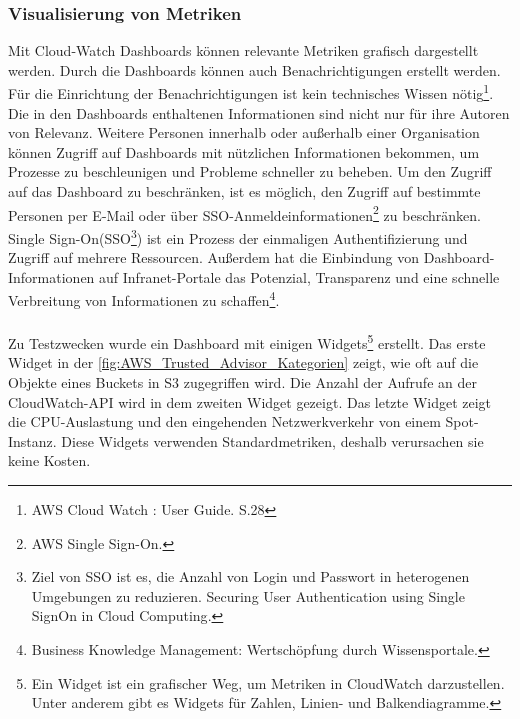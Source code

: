 \subsubsection*{Visualisierung von Metriken}
Mit Cloud-Watch Dashboards können relevante Metriken grafisch dargestellt werden. %
Durch die Dashboards können auch Benachrichtigungen erstellt werden. Für die Einrichtung der Benachrichtigungen ist kein technisches Wissen nötig\footnote{AWS Cloud Watch : User Guide. S.28\cite{AMZ14}}.
Die in den Dashboards enthaltenen Informationen sind nicht nur für ihre Autoren von Relevanz. Weitere Personen innerhalb oder außerhalb einer Organisation können Zugriff auf Dashboards mit nützlichen Informationen bekommen, um Prozesse zu beschleunigen und Probleme schneller zu beheben. Um den Zugriff auf das Dashboard zu beschränken, ist es möglich, den Zugriff auf bestimmte Personen per E-Mail oder über SSO-Anmeldeinformationen\footnote{ AWS Single Sign-On.\cite{AMZ33}} zu beschränken. Single Sign-On(SSO\footnote{Ziel von SSO ist es, die Anzahl von Login und Passwort in heterogenen Umgebungen zu reduzieren. Securing User Authentication using Single SignOn in Cloud Computing\cite{SSO}.}) ist ein Prozess der einmaligen Authentifizierung und Zugriff auf mehrere Ressourcen. Außerdem hat die Einbindung von Dashboard-Informationen auf Infranet-Portale das Potenzial, Transparenz und eine schnelle Verbreitung von Informationen zu schaffen\footnote{Business Knowledge Management: Wertschöpfung durch Wissensportale\cite{BKM}.}. 
\\\\
Zu Testzwecken wurde ein Dashboard mit einigen Widgets\footnote{Ein Widget ist ein grafischer Weg, um Metriken in CloudWatch darzustellen. Unter anderem gibt es Widgets für Zahlen, Linien- und Balkendiagramme.} erstellt. Das erste Widget in der \autoref{fig:AWS_Trusted_Advisor_Kategorien} zeigt, wie oft auf die Objekte eines Buckets in S3 zugegriffen wird. Die Anzahl der Aufrufe an der CloudWatch-API wird in dem zweiten Widget gezeigt. Das letzte Widget zeigt die CPU-Auslastung und den eingehenden Netzwerkverkehr von einem Spot-Instanz. Diese Widgets verwenden Standardmetriken, deshalb verursachen sie keine Kosten. 
